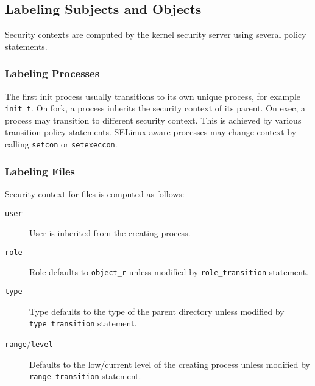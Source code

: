 \subsection{Labeling Subjects and Objects}

Security contexts are computed by the kernel security server using several
policy statements.

\subsubsection{Labeling Processes}
The first init process usually transitions to its own unique process, for
example \texttt{init\_t}. On fork, a process inherits the security context of
its parent. On exec, a process may transition to different security context.
This is achieved by various transition policy statements. SELinux-aware
processes may change context by calling \texttt{setcon} or \texttt{setexeccon}.

\subsubsection{Labeling Files}
Security context for files is computed as follows:
\begin{description}
    \item [\texttt{user}] User is inherited from the creating process.
    \item [\texttt{role}] Role defaults to \texttt{object\_r} unless modified by
        \texttt{role\_transition} statement.
    \item [\texttt{type}] Type defaults to the type of the parent directory
        unless modified by \texttt{type\_transition} statement.
    \item [\texttt{range}/\texttt{level}] Defaults to the low/current level of
        the creating process unless modified by \texttt{range\_transition}
        statement.
\end{description}


